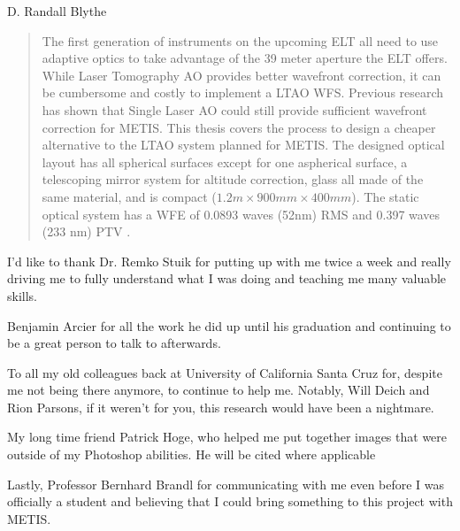\documentclass[
11pt, %
english, %
singlespacing, %
headsepline, %
]{MastersDoctoralThesis} %
\begin{document}
\hfill D. Randall Blythe


\begin{abstract}
\addchaptertocentry{\abstractname} %
The first generation of instruments on the upcoming ELT all need to use adaptive optics to take advantage of the 39 meter aperture the ELT offers.  While Laser Tomography AO provides better wavefront correction, it can be cumbersome and costly to implement a LTAO WFS.  Previous research has shown that Single Laser AO could still provide sufficient wavefront correction for METIS.  This thesis covers the process to design a cheaper alternative to the LTAO system planned for METIS.  The designed optical layout has all spherical surfaces except for one aspherical surface, a telescoping mirror system for altitude correction, glass all made of the same material, and is compact ($1.2m \times 900mm \times 400mm$).  The static optical system has a WFE of 0.0893 waves (52nm) RMS  and 0.397 waves (233 nm) PTV .
\end{abstract}


\begin{acknowledgements}
\addchaptertocentry{\acknowledgementname} %

I'd like to thank Dr. Remko Stuik for putting up with me twice a week and really driving me to fully understand what I was doing and teaching me many valuable skills.  

Benjamin Arcier for all the work he did up until his graduation and continuing to be a great person to talk to afterwards.  

To all my old colleagues back at University of California Santa Cruz for, despite me not being there anymore, to continue to help me.  Notably, Will Deich and Rion Parsons, if it weren't for you, this research would have been a nightmare.  

My long time friend Patrick Hoge, who helped me put together images that were outside of my Photoshop abilities.  He will be cited where applicable

Lastly, Professor Bernhard Brandl for communicating with me even before I was officially a student and believing that I could bring something to this project with METIS.

\end{acknowledgements}
\end{document}
